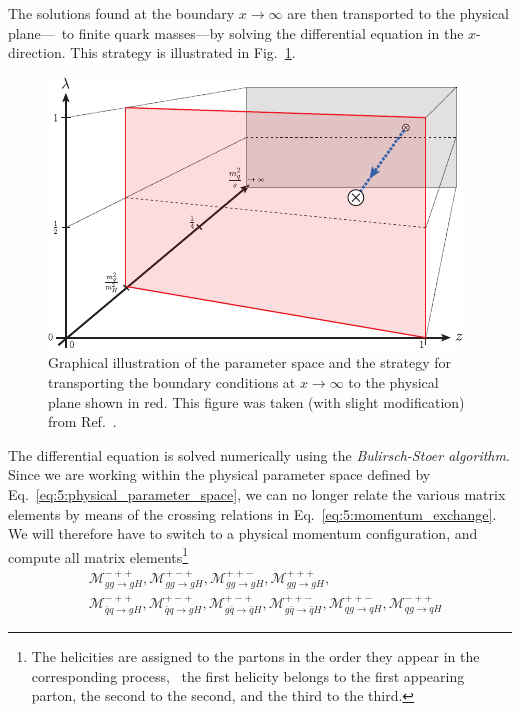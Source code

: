 The solutions found at the boundary $x \rightarrow \infty$ are then transported to the physical plane---\ie\ to finite quark masses---by solving the differential equation in the $x$-direction. This strategy is illustrated in Fig.~\ref{fig:5:integration3D}.
\begin{figure}[ht]
\centering
\includegraphics[width=\figurewidth]{Images/integration3D_no_threshold.pdf}
\caption{Graphical illustration of the parameter space and the strategy for transporting the boundary conditions at $x \rightarrow \infty$ to the physical plane shown in red. This figure was taken (with slight modification) from Ref.~\cite{Niggetiedt:2023ywb}.}
\label{fig:5:integration3D}
\end{figure}
The differential equation is solved numerically using the \textit{Bulirsch-Stoer algorithm}. Since we are working within the physical parameter space defined by Eq.~\eqref{eq:5:physical_parameter_space}, we can no longer relate the various matrix elements by means of the crossing relations in Eq.~\eqref{eq:5:momentum_exchange}. We will therefore have to switch to a physical momentum configuration, and compute all matrix elements\footnote{The helicities are assigned to the partons in the order they appear in the corresponding process, \ie\ the first helicity belongs to the first appearing parton, the second to the second, and the third to the third.}
\begin{equation}
\begin{split}
&\mathcal{M}_{gg \rightarrow g H }^{-++}, \mathcal{M}_{gg \rightarrow gH}^{+-+}, \mathcal{M}_{gg \rightarrow gH}^{++-}, \mathcal{M}_{gg \rightarrow gH }^{+++}, \\
&\mathcal{M}_{\bar{q} q \rightarrow gH }^{-++}, \mathcal{M}_{\bar{q} q \rightarrow gH }^{+-+}, \mathcal{M}_{g\bar{q} \rightarrow \bar{q}H}^{+-+}, \mathcal{M}_{g\bar{q} \rightarrow \bar{q}H}^{++-}, \mathcal{M}_{qg \rightarrow q H}^{++-}, \mathcal{M}_{qg \rightarrow q H}^{-++}
\end{split}
\end{equation}
